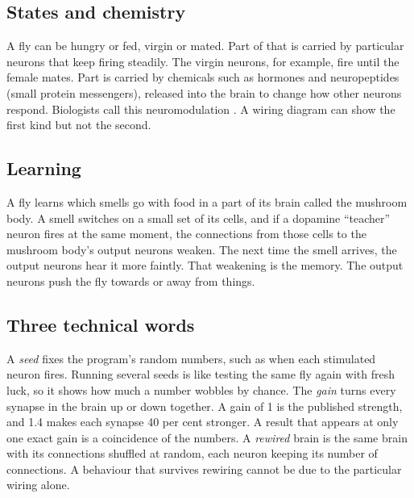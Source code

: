 \subsection*{States and chemistry}

A fly can be hungry or fed, virgin or mated. Part of that is carried by particular neurons that keep firing steadily. The virgin neurons, for example, fire until the female mates. Part is carried by chemicals such as hormones and neuropeptides (small protein messengers), released into the brain to change how other neurons respond. Biologists call this neuromodulation \citep{marder2012neuromodulation}. A wiring diagram can show the first kind but not the second.

\subsection*{Learning}

A fly learns which smells go with food in a part of its brain called the mushroom body. A smell switches on a small set of its cells, and if a dopamine ``teacher'' neuron fires at the same moment, the connections from those cells to the mushroom body's output neurons weaken. The next time the smell arrives, the output neurons hear it more faintly. That weakening is the memory. The output neurons push the fly towards or away from things.

\subsection*{Three technical words}

A \emph{seed} fixes the program's random numbers, such as when each stimulated neuron fires. Running several seeds is like testing the same fly again with fresh luck, so it shows how much a number wobbles by chance. The \emph{gain} turns every synapse in the brain up or down together. A gain of 1 is the published strength, and 1.4 makes each synapse 40 per cent stronger. A result that appears at only one exact gain is a coincidence of the numbers. A \emph{rewired} brain is the same brain with its connections shuffled at random, each neuron keeping its number of connections. A behaviour that survives rewiring cannot be due to the particular wiring alone.

